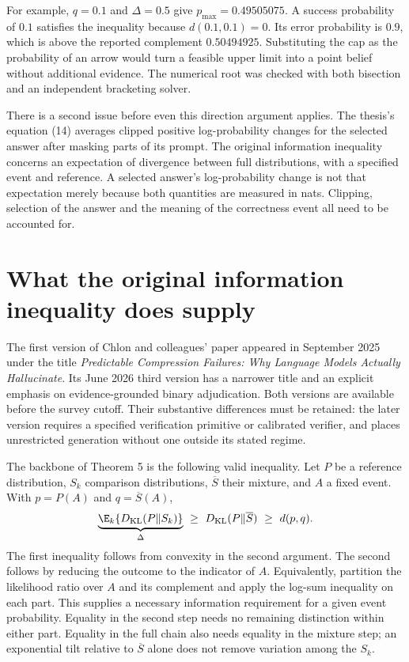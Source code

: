 For example, $q=0.1$ and $\Delta=0.5$ give
$p_{\max}=0.49505075$. A success probability of $0.1$ satisfies the inequality
because $d(0.1,0.1)=0$. Its error probability is $0.9$, which is above the
reported complement $0.50494925$. Substituting the cap as the probability of
an arrow would turn a feasible upper limit into a point belief without
additional evidence. The numerical root was checked with both bisection and
an independent bracketing solver.

There is a second issue before even this direction argument applies.
The thesis's equation (14) averages clipped positive log-probability changes
for the selected answer after masking parts of its prompt. The original
information inequality concerns an expectation of divergence between full
distributions, with a specified event and reference. A selected answer's
log-probability change is not that expectation merely because both quantities
are measured in nats. Clipping, selection of the answer and the meaning of
the correctness event all need to be accounted for.
\citep[pp.~46--47]{closure30molero}

\section{What the original information inequality does supply}

The first version of Chlon and colleagues' paper appeared in September 2025
under the title \emph{Predictable Compression Failures: Why Language Models
Actually Hallucinate}. Its June 2026 third version has a narrower title and
an explicit emphasis on evidence-grounded binary adjudication. Both versions
are available before the survey cutoff. Their substantive differences must
be retained: the later version requires a specified verification primitive
or calibrated verifier, and places unrestricted generation without one
outside its stated regime.
\citep{closure30chlonone,closure30chlonthree}

The backbone of Theorem 5 is the following valid inequality. Let $P$ be a
reference distribution, $S_k$ comparison distributions, $\overline S$ their
mixture, and $A$ a fixed event. With $p=P(A)$ and $q=\overline S(A)$,
\begin{equation}
 \underbrace{\E_k\{D_{\rm KL}(P\Vert S_k)\}}_{\Delta}
 \ \geq\ D_{\rm KL}(P\Vert\overline S)
 \ \geq\ d(p,q).
 \label{closure30:information-chain}
\end{equation}
The first inequality follows from convexity in the second argument. The
second follows by reducing the outcome to the indicator of $A$. Equivalently,
partition the likelihood ratio over $A$ and its complement and apply the
log-sum inequality on each part. This supplies a necessary information
requirement for a given event probability. Equality in the second step needs
no remaining distinction within either part. Equality in the full chain also
needs equality in the mixture step; an exponential tilt relative to
$\overline S$ alone does not remove variation among the $S_k$.
\citep[Theorem 5 and Appendix A.4]{closure30chlonone,closure30chlonthree}

